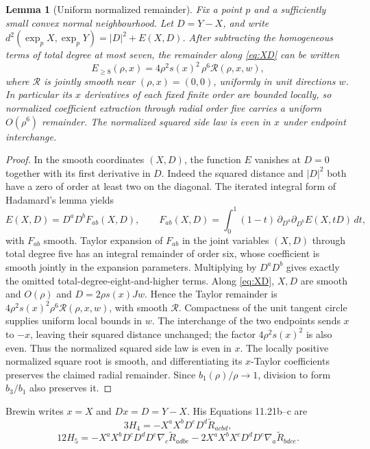 \documentclass[11pt]{amsart}
\numberwithin{equation}{section}
\newtheorem{lemma}[theorem]{Lemma}
\theoremstyle{remark}
\newcommand{\BRiem}{\widetilde{R}}
\begin{document}
\begin{lemma}[Uniform normalized remainder]\label{lem:uniform-remainder}
Fix a point $p$ and a sufficiently small convex normal neighbourhood. Let
$D=Y-X$, and write $d^2(\exp_pX,\exp_pY)=|D|^2+E(X,D)$.
After subtracting the homogeneous terms of total degree at most seven, the
remainder along \eqref{eq:XD} can be written
\[
 E_{\geq8}(\rho,x)=4\rho^2s(x)^2\,\rho^6\mathcal R(\rho,x,w),
\]
where $\mathcal R$ is jointly smooth near $(\rho,x)=(0,0)$, uniformly in unit
directions $w$. In particular its $x$ derivatives of each fixed finite order
are bounded locally, so normalized coefficient extraction through radial
order five carries a uniform $O(\rho^6)$ remainder. The normalized squared
side law is even in $x$ under endpoint interchange.
\end{lemma}
\begin{proof}
In the smooth coordinates $(X,D)$, the function $E$ vanishes at $D=0$
together with its first derivative in $D$. Indeed the squared distance and
$|D|^2$ both have a zero of order at least two on the diagonal. The iterated
integral form of Hadamard's lemma yields
\[
 E(X,D)=D^aD^bF_{ab}(X,D),\qquad
 F_{ab}(X,D)=\int_0^1(1-t)\,\partial_{D^a}\partial_{D^b}E(X,tD)\,dt,
\]
with $F_{ab}$ smooth. Taylor expansion of $F_{ab}$ in the joint variables
$(X,D)$ through total degree five has an integral remainder of order six,
whose coefficient is smooth jointly in the expansion parameters. Multiplying
by $D^aD^b$ gives exactly the omitted total-degree-eight-and-higher terms.
Along \eqref{eq:XD}, $X,D$ are smooth and $O(\rho)$ and
$D=2\rho s(x)Jw$. Hence the Taylor remainder is
$4\rho^2s(x)^2\rho^6\mathcal R(\rho,x,w)$, with smooth $\mathcal R$.
Compactness of the unit tangent circle supplies uniform local bounds in $w$.
The interchange of the two endpoints sends $x$ to $-x$, leaving their
squared distance unchanged; the factor $4\rho^2s(x)^2$ is also even. Thus
the normalized squared side law is even in $x$. The locally positive
normalized square root is smooth, and differentiating its $x$-Taylor
coefficients preserves the claimed radial remainder. Since
$b_1(\rho)/\rho\to1$, division to form $b_3/b_1$ also preserves it.
\end{proof}

Brewin writes $x=X$ and $Dx=D=Y-X$.  His Equations 11.21b--c are
\begin{equation}\label{eq:brewin-b}
 3H_4=-X^aX^bD^cD^d\BRiem_{acbd},
\end{equation}
\begin{equation}\label{eq:brewin-c}
 12H_5=-X^aX^bD^cD^dD^e\nabla_c\BRiem_{adbe}
 -2X^aX^bX^cD^dD^e\nabla_a\BRiem_{bdce}.
\end{equation}
\end{document}

